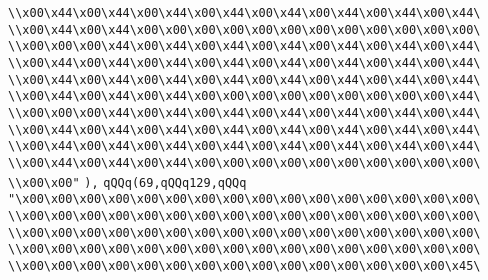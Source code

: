\verb|\\x00\x44\x00\x44\x00\x44\x00\x44\x00\x44\x00\x44\x00\x44\x00\x44\|\newline
\verb|\\x00\x44\x00\x44\x00\x00\x00\x00\x00\x00\x00\x00\x00\x00\x00\x00\|\newline
\verb|\\x00\x00\x00\x44\x00\x44\x00\x44\x00\x44\x00\x44\x00\x44\x00\x44\|\newline
\verb|\\x00\x44\x00\x44\x00\x44\x00\x44\x00\x44\x00\x44\x00\x44\x00\x44\|\newline
\verb|\\x00\x44\x00\x44\x00\x44\x00\x44\x00\x44\x00\x44\x00\x44\x00\x44\|\newline
\verb|\\x00\x44\x00\x44\x00\x44\x00\x00\x00\x00\x00\x00\x00\x00\x00\x44\|\newline
\verb|\\x00\x00\x00\x44\x00\x44\x00\x44\x00\x44\x00\x44\x00\x44\x00\x44\|\newline
\verb|\\x00\x44\x00\x44\x00\x44\x00\x44\x00\x44\x00\x44\x00\x44\x00\x44\|\newline
\verb|\\x00\x44\x00\x44\x00\x44\x00\x44\x00\x44\x00\x44\x00\x44\x00\x44\|\newline
\verb|\\x00\x44\x00\x44\x00\x44\x00\x00\x00\x00\x00\x00\x00\x00\x00\x00\|\newline
\verb|\\x00\x00"|\newline
\verb|),|\newline
\verb|qQQq(69,qQQq129,qQQq|\newline
\verb|"\x00\x00\x00\x00\x00\x00\x00\x00\x00\x00\x00\x00\x00\x00\x00\x00\|\newline
\verb|\\x00\x00\x00\x00\x00\x00\x00\x00\x00\x00\x00\x00\x00\x00\x00\x00\|\newline
\verb|\\x00\x00\x00\x00\x00\x00\x00\x00\x00\x00\x00\x00\x00\x00\x00\x00\|\newline
\verb|\\x00\x00\x00\x00\x00\x00\x00\x00\x00\x00\x00\x00\x00\x00\x00\x00\|\newline
\verb|\\x00\x00\x00\x00\x00\x00\x00\x00\x00\x00\x00\x00\x00\x00\x00\x45\|\newline
